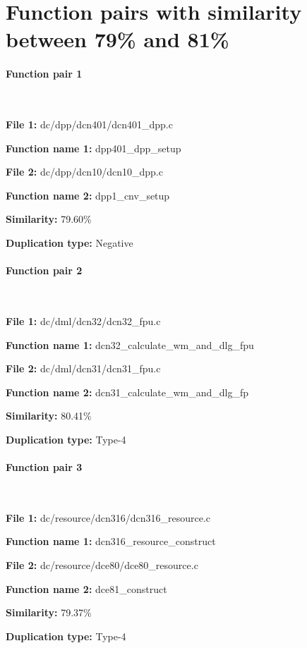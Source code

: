 \section{Function pairs with similarity between 79\% and 81\%}

\paragraph{Function pair 1 }  

\

\textbf{File 1:} dc/dpp/dcn401/dcn401\_dpp.c

\textbf{Function name 1:} dpp401\_dpp\_setup

\textbf{File 2:} dc/dpp/dcn10/dcn10\_dpp.c

\textbf{Function name 2:} dpp1\_cnv\_setup

\textbf{Similarity:} 79.60\%

\textbf{Duplication type:} Negative


\paragraph{Function pair 2 }  

\

\textbf{File 1:} dc/dml/dcn32/dcn32\_fpu.c

\textbf{Function name 1:} dcn32\_calculate\_wm\_and\_dlg\_fpu

\textbf{File 2:} dc/dml/dcn31/dcn31\_fpu.c

\textbf{Function name 2:} dcn31\_calculate\_wm\_and\_dlg\_fp

\textbf{Similarity:} 80.41\%

\textbf{Duplication type:} Type-4


\paragraph{Function pair 3 }  

\

\textbf{File 1:} dc/resource/dcn316/dcn316\_resource.c

\textbf{Function name 1:} dcn316\_resource\_construct

\textbf{File 2:} dc/resource/dce80/dce80\_resource.c

\textbf{Function name 2:} dce81\_construct 

\textbf{Similarity:} 79.37\%

\textbf{Duplication type:} Type-4


